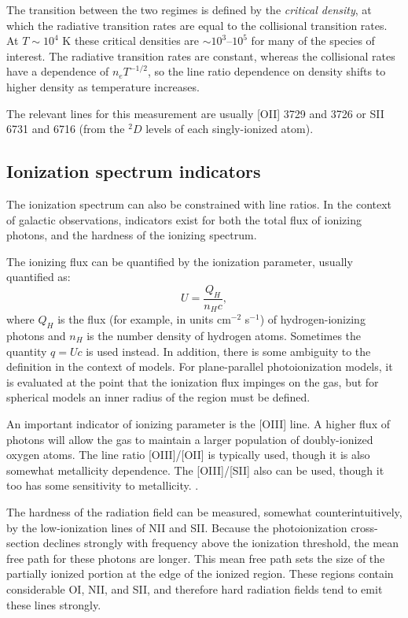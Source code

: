 The transition between the two regimes is defined by the {\it critical
density}, at which the radiative transition rates are equal to the
collisional transition rates. At $T\sim 10^4$ K these critical
densities are $\sim 10^3$--$10^5$ for many of the species of
interest. The radiative transition rates are constant, whereas the
collisional rates have a dependence of $n_e T^{-1/2}$, so the
line ratio dependence on density shifts to higher density as
temperature increases. 

The relevant lines for this measurement are usually [OII] 3729 and
3726 or SII 6731 and 6716 (from the ${}^2D$ levels of each
singly-ionized atom).

\subsection{Ionization spectrum indicators}

The ionization spectrum can also be constrained with line ratios. In
the context of galactic observations, indicators exist for both the
total flux of ionizing photons, and the hardness of the ionizing
spectrum.

The ionizing flux can be quantified by the ionization parameter,
usually quantified as:
\begin{equation}
U = \frac{Q_{H}}{n_H c},
\end{equation}
where $Q_H$ is the flux (for example, in units cm$^{-2}$ s$^{-1}$) of
hydrogen-ionizing photons and $n_H$ is the number density of hydrogen
atoms. Sometimes the quantity $q=U c$ is used instead. In addition,
there is some ambiguity to the definition in the context of
models. For plane-parallel photoionization models, it is evaluated at
the point that the ionization flux impinges on the gas, but for
spherical models an inner radius of the region must be defined.

An important indicator of ionizing parameter is the [OIII] line. A
higher flux of photons will allow the gas to maintain a larger
population of doubly-ionized oxygen atoms. The line ratio [OIII]/[OII]
is typically used, though it is also somewhat metallicity
dependence. The [OIII]/[SII] also can be used, though it too has some
sensitivity to metallicity.  .

The hardness of the radiation field can be measured, somewhat
counterintuitively, by the low-ionization lines of NII and
SII. Because the photoionization cross-section declines strongly with
frequency above the ionization threshold, the mean free path for these
photons are longer. This mean free path sets the size of the partially
ionized portion at the edge of the ionized region. These regions
contain considerable OI, NII, and SII, and therefore hard radiation
fields tend to emit these lines strongly.

